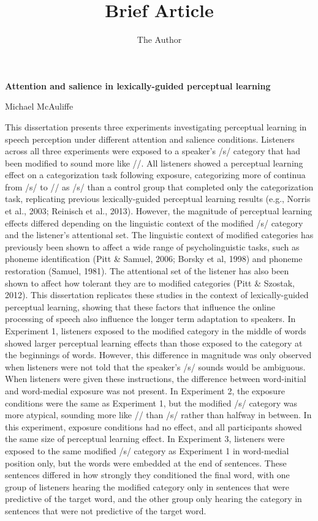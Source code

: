\documentclass[11pt]{article} %
\title{Brief Article}
\author{The Author}
\begin{document}
\thispagestyle{empty}
\begin{center}
\textbf{Attention and salience in lexically-guided perceptual learning}

Michael McAuliffe
\end{center}
This dissertation presents three experiments investigating perceptual learning in speech perception under different attention and salience conditions.
Listeners across all three experiments were exposed to a speaker's /s/ category that had been modified to sound more like /\textesh/.
All listeners showed a perceptual learning effect on a categorization task following exposure, categorizing more of continua from /s/ to /\textesh/ as /s/ than a control group that completed only the categorization task, replicating previous lexically-guided perceptual learning results (e.g., Norris et al., 2003; Reinisch et al., 2013).
However, the magnitude of perceptual learning effects differed depending on the linguistic context of the modified /s/ category and the listener's attentional set.
The linguistic context of modified categories has previously been shown to affect a wide range of psycholinguistic tasks, such as phoneme identification (Pitt \& Samuel, 2006; Borsky et al, 1998) and phoneme restoration (Samuel, 1981).
The attentional set of the listener has also been shown to affect how tolerant they are to modified categories (Pitt \& Szostak, 2012).
This dissertation replicates these studies in the context of lexically-guided perceptual learning, showing that these factors that influence the online processing of speech also influence the longer term adaptation to speakers.
In Experiment 1, listeners exposed to the modified category in the middle of words showed larger perceptual learning effects than those exposed to the category at the beginnings of words.
However, this difference in magnitude was only observed when listeners were not told that the speaker's /s/ sounds would be ambiguous.  
When listeners were given these instructions, the difference between word-initial and word-medial exposure was not present.
In Experiment 2, the exposure conditions were the same as Experiment 1, but the modified /s/ category was more atypical, sounding more like /\textesh/ than /s/ rather than halfway in between.
In this experiment, exposure conditions had no effect, and all participants showed the same size of perceptual learning effect.
In Experiment 3, listeners were exposed to the same modified /s/ category as Experiment 1 in word-medial position only, but the words were embedded at the end of sentences.
These sentences differed in how strongly they conditioned the final word, with one group of listeners hearing the modified category only in sentences that were predictive of the target word, and the other group only hearing the category in sentences that were not predictive of the target word.
\end{document}
